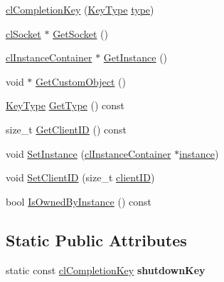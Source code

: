 \begin{DoxyCompactItemize}
\item 
\hyperlink{classcl_completion_key_a459751418055da6035f05b1824e91732}{clCompletionKey} (\hyperlink{classcl_completion_key_a3a2147c7a8a50fc3333cee949105ab12}{KeyType} \hyperlink{classcl_completion_key_aa63f9e5342dac65b56fab6a424065aa9}{type})
\item 
\hyperlink{classcl_socket}{clSocket} $\ast$ \hyperlink{classcl_completion_key_a41872a48e234fe0755cdae8fc2a571cc}{GetSocket} ()
\item 
\hyperlink{classcl_instance_container}{clInstanceContainer} $\ast$ \hyperlink{classcl_completion_key_a9bd1b328dd61186ad8ad1ea728fe2d7c}{GetInstance} ()
\item 
void $\ast$ \hyperlink{classcl_completion_key_ad771291eeb1120df5a67389b2da66117}{GetCustomObject} ()
\item 
\hyperlink{classcl_completion_key_a3a2147c7a8a50fc3333cee949105ab12}{KeyType} \hyperlink{classcl_completion_key_a8d898966ef4243ccf1d1c970df1123d6}{GetType} () const 
\item 
size\_\-t \hyperlink{classcl_completion_key_aebadd77b6ae5add56dacd7e6c0df0da8}{GetClientID} () const 
\item 
void \hyperlink{classcl_completion_key_acebbdd34c7aba9ebdabbf6cbc2428e6d}{SetInstance} (\hyperlink{classcl_instance_container}{clInstanceContainer} $\ast$\hyperlink{classcl_completion_key_aa35aa701d8a009f709509ba26ead3275}{instance})
\item 
void \hyperlink{classcl_completion_key_a0555ad4d508050020e90305ff4becdb5}{SetClientID} (size\_\-t \hyperlink{classcl_completion_key_a512eecc783be96d6afe9a75c05c1ff18}{clientID})
\item 
bool \hyperlink{classcl_completion_key_acec42cb269ecbd067be61bb91ae5d5df}{IsOwnedByInstance} () const 
\end{DoxyCompactItemize}
\subsection*{Static Public Attributes}
\begin{DoxyCompactItemize}
\item 
\hypertarget{classcl_completion_key_a3fab82ad0825292a6b28e2236fcfee8d}{
static const \hyperlink{classcl_completion_key}{clCompletionKey} {\bfseries shutdownKey}}
\label{classcl_completion_key_a3fab82ad0825292a6b28e2236fcfee8d}

\end{DoxyCompactItemize}
